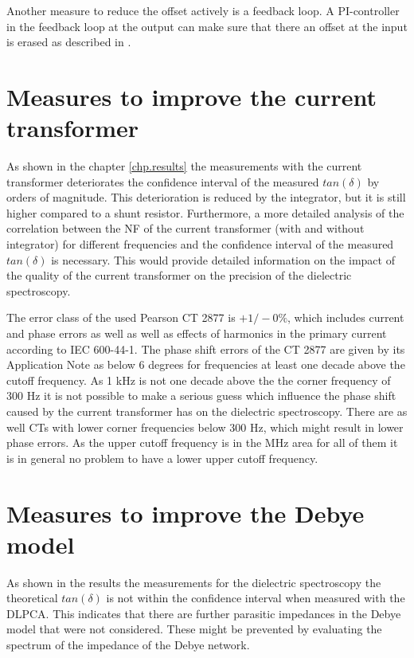 Another measure to reduce the offset actively is a feedback loop. A PI-controller in the feedback loop at the output can make sure that there an offset at the input is erased as described in \cite{thomas}. 

\section{Measures to improve the current transformer}
As shown in the chapter \ref{chp.results} the measurements with the current transformer deteriorates the confidence interval of the measured $tan(\delta)$ by orders of magnitude. This deterioration is reduced by the integrator, but it is still higher compared to a shunt resistor. 
Furthermore, a more detailed analysis of the correlation between the NF of the current transformer (with and without integrator) for different frequencies and the confidence interval of the measured $tan(\delta)$ is necessary. This would provide detailed information on the impact of the quality of the current transformer on the precision of the dielectric spectroscopy. 

The error class of the used Pearson CT 2877 is $+1 / -0 \% $, which includes current and phase errors as well as well as effects of harmonics in the primary current according to IEC 600-44-1. The phase shift errors of the CT 2877 are given by its Application Note \protect\footnotemark as below 6 degrees for frequencies at least one decade above the cutoff frequency. As 1 kHz is not one decade above the the corner frequency of 300 Hz it is not possible to make a serious guess which influence the phase shift caused by the current transformer has on the dielectric spectroscopy. There are as well CTs with lower corner frequencies below 300 Hz, which might result in lower phase errors. As the upper cutoff frequency is in the MHz area for all of them it is in general no problem to have a lower upper cutoff frequency. 

\section{Measures to improve the Debye model}
\label{debyemodel}
As shown in the results the measurements for the dielectric spectroscopy the theoretical $tan(\delta)$ is not within the confidence interval when measured with the DLPCA. This indicates that there are further parasitic impedances in the Debye model that were not considered. These might be prevented by evaluating the spectrum of the impedance of the Debye network. 



